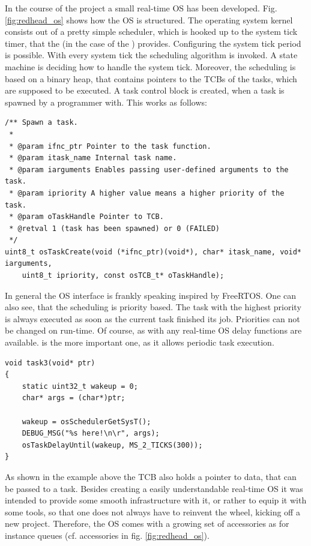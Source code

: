 In the course of the project a small real-time \gls{OS} has been developed. Fig. \ref{fig:redhead_os} shows how the \gls{OS} is structured. The operating system kernel consists out of a pretty simple scheduler, which is hooked up to the system tick timer, that the  (in the case of the ) provides. Configuring the system tick period is possible. With every system tick the scheduling algorithm is invoked. A state machine is deciding how to handle the system tick. Moreover, the scheduling is based on a binary heap, that contains pointers to the \glspl{TCB} of the tasks, which are supposed to be executed. A task control block is created, when a task is spawned by a programmer with. This works as follows:

\begin{verbatim}
/** Spawn a task.
 *
 * @param ifnc_ptr Pointer to the task function.
 * @param itask_name Internal task name.
 * @param iarguments Enables passing user-defined arguments to the task.
 * @param ipriority A higher value means a higher priority of the task.
 * @param oTaskHandle Pointer to TCB.
 * @retval 1 (task has been spawned) or 0 (FAILED)
 */
uint8_t osTaskCreate(void (*ifnc_ptr)(void*), char* itask_name, void* iarguments, 
	uint8_t ipriority, const osTCB_t* oTaskHandle);
\end{verbatim}

In general the \gls{OS} interface is frankly speaking inspired by FreeRTOS\texttrademark{}. One can also see, that the scheduling is priority based. The task with the highest priority is always executed as soon as the current task finished its job. Priorities can not be changed on run-time. Of course, as with any real-time \gls{OS} delay functions are available.  is the more important one, as it allows periodic task execution. 

\begin{verbatim}
void task3(void* ptr)
{
	static uint32_t wakeup = 0;
	char* args = (char*)ptr;

	wakeup = osSchedulerGetSysT();
	DEBUG_MSG("%s here!\n\r", args);
	osTaskDelayUntil(wakeup, MS_2_TICKS(300));
}
\end{verbatim}

As shown in the example above the \gls{TCB} also holds a pointer to data, that can be passed to a task. 
\newpar 
Besides creating a easily understandable real-time \gls{OS} it was intended to provide some smooth infrastructure with it, or rather to equip it with some tools, so that one does not always have to reinvent the wheel, kicking off a new project. Therefore, the \gls{OS} comes with a growing set of accessories as for instance queues (cf. accessories in fig. \ref{fig:redhead_os}). 

